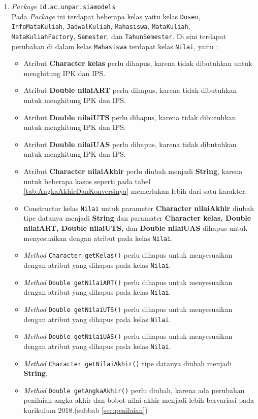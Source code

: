 \begin{enumerate}
	\item \textit{Package} \texttt{id.ac.unpar.siamodels}\\
	Pada \textit{Package} ini terdapat beberapa kelas yaitu kelas \texttt{Dosen}, \texttt{InfoMataKuliah}, \texttt{JadwalKuliah}, \texttt{Mahasiswa}, \texttt{MataKuliah}, \texttt{MataKuliahFactory}, \texttt{Semester}, dan \texttt{TahunSemester}. Di sini terdapat perubahan di dalam kelas \texttt{Mahasiswa} terdapat kelas \texttt{Nilai}, yaitu :
	\begin{itemize}
		\item Atribut \textbf{Character kelas} perlu dihapus, karena tidak dibutuhkan untuk menghitung IPK dan IPS.
		\item Atribut \textbf{Double nilaiART} perlu dihapus, karena tidak dibutuhkan untuk menghitung IPK dan IPS.
		\item Atribut \textbf{Double nilaiUTS} perlu dihapus, karena tidak dibutuhkan untuk menghitung IPK dan IPS.
		\item Atribut \textbf{Double nilaiUAS} perlu dihapus, karena tidak dibutuhkan untuk menghitung IPK dan IPS.
		\item Atribut \textbf{Character nilaiAkhir} perlu diubah menjadi \textbf{String}, karena untuk beberapa kasus seperti pada tabel \ref{tab:AngkaAkhirDanKonversinya} memerlukan lebih dari satu karakter.
		\item Constructor kelas \texttt{Nilai} untuk parameter \textbf{Character nilaiAkhir} diubah tipe datanya menjadi \textbf{String} dan paramater \textbf{Character kelas, Double nilaiART, Double nilaiUTS,} dan \textbf{Double nilaiUAS} dihapus untuk menyesuaikan dengan atribut pada kelas \texttt{Nilai}.
		\item \textit{Method} \texttt{Character getKelas()} perlu dihapus untuk menyesuaikan dengan atribut yang dihapus pada kelas \texttt{Nilai}.
		\item \textit{Method} \texttt{Double getNilaiART()} perlu dihapus untuk menyesuaikan dengan atribut yang dihapus pada kelas \texttt{Nilai}.
		\item \textit{Method} \texttt{Double getNilaiUTS()} perlu dihapus untuk menyesuaikan dengan atribut yang dihapus pada kelas \texttt{Nilai}.
		\item \textit{Method} \texttt{Double getNilaiUAS()} perlu dihapus untuk menyesuaikan dengan atribut yang dihapus pada kelas \texttt{Nilai}.
		\item \textit{Method} \texttt{Character getNilaiAkhir()} tipe datanya diubah menjadi \textbf{String}.
		\item \textit{Method} \texttt{Double getAngkaAkhir()} perlu diubah, karena ada perubahan penilaian angka akhir dan bobot nilai akhir menjadi lebih bervariasi pada kurikulum 2018.(subbab \ref{sec:penilaian}) 

\end{itemize}
\end{enumerate}
